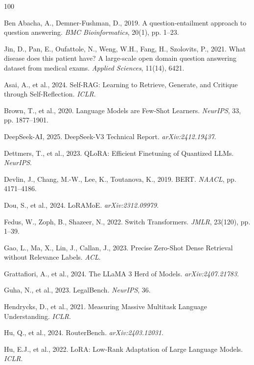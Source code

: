 \documentclass[a4paper,fleql,doubleblind]{cas-sc}
\begin{document}
\begin{thebibliography}{100}

Ben Abacha, A., Demner-Fushman, D., 2019. A question-entailment approach to question answering. \textit{BMC Bioinformatics}, 20(1), pp. 1--23.

Jin, D., Pan, E., Oufattole, N., Weng, W.H., Fang, H., Szolovits, P., 2021. What disease does this patient have? A large-scale open domain question answering dataset from medical exams. \textit{Applied Sciences}, 11(14), 6421.

Asai, A., et al., 2024. Self-RAG: Learning to Retrieve, Generate, and Critique through Self-Reflection. \textit{ICLR}.

Brown, T., et al., 2020. Language Models are Few-Shot Learners. \textit{NeurIPS}, 33, pp. 1877--1901.


DeepSeek-AI, 2025. DeepSeek-V3 Technical Report. \textit{arXiv:2412.19437}.

Dettmers, T., et al., 2023. QLoRA: Efficient Finetuning of Quantized LLMs. \textit{NeurIPS}.

Devlin, J., Chang, M.-W., Lee, K., Toutanova, K., 2019. BERT. \textit{NAACL}, pp. 4171--4186.

Dou, S., et al., 2024. LoRAMoE. \textit{arXiv:2312.09979}.

Fedus, W., Zoph, B., Shazeer, N., 2022. Switch Transformers. \textit{JMLR}, 23(120), pp. 1--39.

Gao, L., Ma, X., Lin, J., Callan, J., 2023. Precise Zero-Shot Dense Retrieval without Relevance Labels. \textit{ACL}.

Grattafiori, A., et al., 2024. The LLaMA 3 Herd of Models. \textit{arXiv:2407.21783}.

Guha, N., et al., 2023. LegalBench. \textit{NeurIPS}, 36.

Hendrycks, D., et al., 2021. Measuring Massive Multitask Language Understanding. \textit{ICLR}.

Hu, Q., et al., 2024. RouterBench. \textit{arXiv:2403.12031}.

Hu, E.J., et al., 2022. LoRA: Low-Rank Adaptation of Large Language Models. \textit{ICLR}.



\end{thebibliography}
\end{document}
